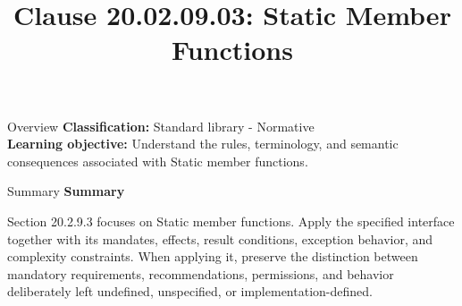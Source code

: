 \documentclass[10pt,letterpaper]{article}
\title{Clause 20.02.09.03: Static Member Functions}
\author{}
\date{}
\begin{document}
\maketitle
\begin{CornellOverviewBox}{Overview}
\textbf{Classification:} Standard library - Normative\\[2pt]
\textbf{Learning objective:} Understand the rules, terminology, and semantic consequences associated with Static member functions.
\end{CornellOverviewBox}\begin{CornellSummaryBox}{Summary}
{\sffamily\bfseries\color{Accent} Summary}\par\vspace{3pt}Section 20.2.9.3 focuses on Static member functions. Apply the specified interface together with its mandates, effects, result conditions, exception behavior, and complexity constraints. When applying it, preserve the distinction between mandatory requirements, recommendations, permissions, and behavior deliberately left undefined, unspecified, or implementation-defined.
\end{CornellSummaryBox}
\end{document}
